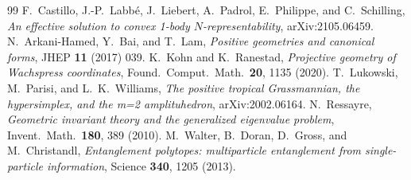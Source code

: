 \documentclass[11pt]{article}
\begin{document}
\begin{thebibliography}{99}
 F.~Castillo, J.-P.~Labb\'e, J.~Liebert, A.~Padrol,
E.~Philippe, and C.~Schilling, \emph{An effective solution to convex
1-body $N$-representability}, arXiv:2105.06459.
 N.~Arkani-Hamed, Y.~Bai, and T.~Lam, \emph{Positive
geometries and canonical forms}, JHEP \textbf{11} (2017) 039.
 K.~Kohn and K.~Ranestad, \emph{Projective geometry
of Wachspress coordinates}, Found.\ Comput.\ Math.\ \textbf{20}, 1135
(2020).
 T.~Lukowski, M.~Parisi, and L.~K.~Williams, \emph{The
positive tropical Grassmannian, the hypersimplex, and the m=2
amplituhedron}, arXiv:2002.06164.
 N.~Ressayre, \emph{Geometric invariant theory and the
generalized eigenvalue problem}, Invent.\ Math.\ \textbf{180}, 389 (2010).
 M.~Walter, B.~Doran, D.~Gross, and M.~Christandl,
\emph{Entanglement polytopes: multiparticle entanglement from
single-particle information}, Science \textbf{340}, 1205 (2013).
\end{thebibliography}
\end{document}
